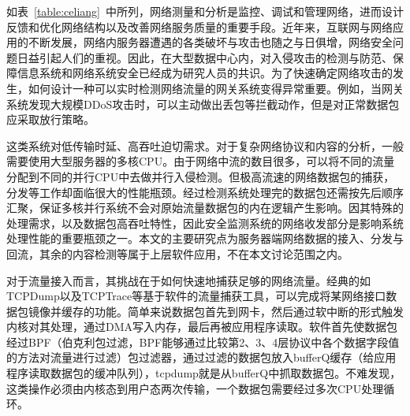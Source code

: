  \label{chap34}

\label{chap341}

如表~\ref{table:celiang}~中所列，网络测量和分析是监控、调试和管理网络，进而设计反馈和优化网络结构以及改善网络服务质量的重要手段。近年来，互联网与网络应用的不断发展，网络内服务器遭遇的各类破坏与攻击也随之与日俱增，网络安全问题日益引起人们的重视。因此，在大型数据中心内，对入侵攻击的检测与防范、保障信息系统和网络系统安全已经成为研究人员的共识。为了快速确定网络攻击的发生，如何设计一种可以实时检测网络流量的网关系统变得异常重要。例如，当网关系统发现大规模DDoS攻击时，可以主动做出丢包等拦截动作，但是对正常数据包应采取放行策略。

这类系统对低传输时延、高吞吐迫切需求。对于复杂网络协议和内容的分析，一般需要使用大型服务器的多核CPU。由于网络中流的数目很多，可以将不同的流量分配到不同的并行CPU中去做并行入侵检测。但极高流速的网络数据包的捕获，分发等工作却面临很大的性能瓶颈。经过检测系统处理完的数据包还需按先后顺序汇聚，保证多核并行系统不会对原始流量数据包的内在逻辑产生影响。因其特殊的处理需求，以及数据包高吞吐特性，因此安全监测系统的网络收发部分是影响系统处理性能的重要瓶颈之一。本文的主要研究点为服务器端网络数据的接入、分发与回流，其余的内容检测等属于上层软件应用，不在本文讨论范围之内。





\label{chap342}

对于流量接入而言，其挑战在于如何快速地捕获足够的网络流量。经典的如TCPDump以及TCPTrace等基于软件的流量捕获工具，可以完成将某网络接口数据包镜像并缓存的功能。简单来说数据包首先到网卡，然后通过软中断的形式触发内核对其处理，通过DMA写入内存，最后再被应用程序读取。软件首先使数据包经过BPF（伯克利包过滤，BPF能够通过比较第2、3、4层协议中各个数据字段值的方法对流量进行过滤）包过滤器，通过过滤的数据包放入bufferQ缓存（给应用程序读取数据包的缓冲队列），tcpdump就是从bufferQ中抓取数据包。不难发现，这类操作必须由内核态到用户态两次传输，一个数据包需要经过多次CPU处理循环。


